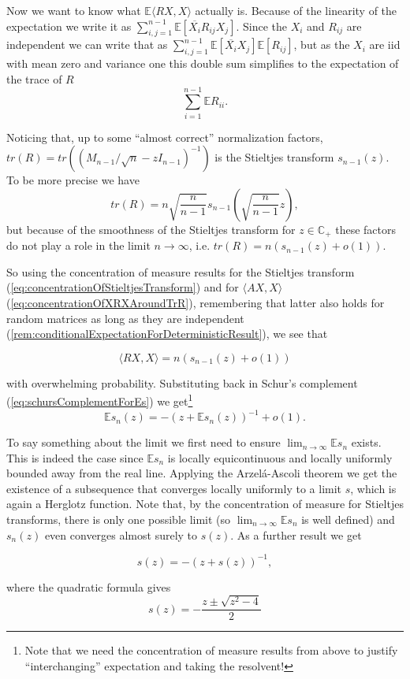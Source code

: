 Now we want to know what $\mathbb E\langle RX,X\rangle$ actually is. Because of the linearity of the expectation we write it as $\sum_{i,j=1}^{n-1}\mathbb E[\overline{X_i}R_{ij}X_j]$. Since the $X_i$ and $R_{ij}$ are independent we can write that as $\sum_{i,j=1}^{n-1}\mathbb E[\overline{X_i}X_j]\mathbb E[R_{ij}]$, but as the $X_i$ are iid with mean zero and variance one this double sum simplifies to the expectation of the trace of $R$ $$\sum_{i=1}^{n-1}\mathbb ER_{ii}.$$

Noticing that, up to some ``almost correct'' normalization factors, $tr(R)=tr\left((M_{n-1}/\sqrt n-zI_{n-1})^{-1}\right)$ is the Stieltjes transform $s_{n-1}(z)$. To be more precise we have $$tr(R)=n\sqrt{\frac{n}{n-1}}s_{n-1}\left(\sqrt{\frac{n}{n-1}}z\right),$$
but because of the smoothness of the Stieltjes transform for $z\in\mathbb C_+$ these factors do not play a role in the limit $n\rightarrow\infty$, i.e. $tr(R)=n(s_{n-1}(z)+o(1))$.

So using the concentration of measure results for the Stieltjes transform (\ref{eq:concentrationOfStieltjesTransform}) and for $\langle AX,X\rangle$(\ref{eq:concentrationOfXRXAroundTrR}), remembering that latter also holds for random matrices as long as they are independent (\ref{rem:conditionalExpectationForDeterministicResult}), we see that

$$\langle RX,X\rangle=n(s_{n-1}(z)+o(1))$$

with overwhelming probability. Substituting back in Schur's complement (\ref{eq:schursComplementForEs}) we get\footnote{Note that we need the concentration of measure results from above to justify ``interchanging'' expectation and taking the resolvent!} $$\mathbb Es_n(z)=-(z+\mathbb Es_n(z))^{-1}+o(1).$$

To say something about the limit we first need to ensure $\lim_{n\rightarrow\infty}\mathbb Es_n$ exists. This is indeed the case since $\mathbb Es_n$ is locally equicontinuous and locally uniformly bounded away from the real line. Applying the Arzel\'{a}-Ascoli theorem we get the existence of a subsequence that converges locally uniformly to a limit $s$, which is again a Herglotz function. Note that, by the concentration of measure for Stieltjes transforms, there is only one possible limit (so $\lim_{n\rightarrow\infty}\mathbb Es_n$ is well defined) and $s_n(z)$ even converges almost surely to $s(z)$. As a further result we get

$$s(z)=-(z+s(z))^{-1},$$

where the quadratic formula gives $$s(z)=-\frac{z\pm\sqrt{z^2-4}}{2}$$

